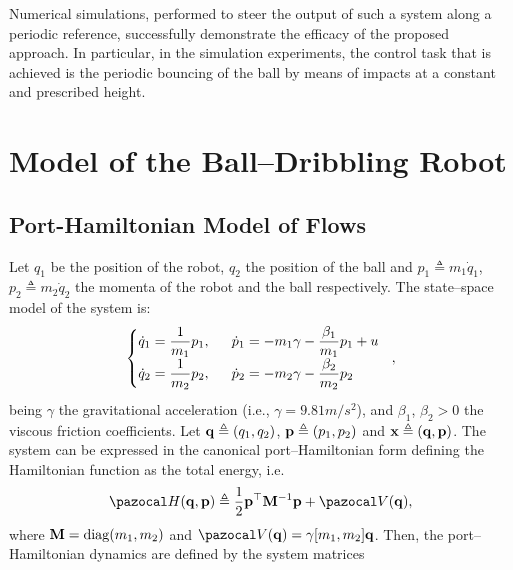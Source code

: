Numerical simulations, performed to steer the output of such a system along a periodic reference, successfully demonstrate the efficacy of the proposed approach. In particular, in the simulation experiments, the control task that is achieved is the periodic bouncing of the ball by means of impacts at a constant and prescribed height.
%
\clearpage
\section{Model of the Ball--Dribbling Robot}\label{sec:DBR}
%
\subsection{Port-Hamiltonian Model of Flows}
Let $q_1$ be the position of the robot, $q_2$ the position of the ball and $p_1 \triangleq  m_1\dot{q}_1$, $p_2 \triangleq  m_2\dot{q}_2$ the momenta of the robot and the ball respectively.
The state--space model of the system is:
%
\begin{equation}\label{eq:state-space}
    \left\{ 
        \begin{matrix*}[l]\vspace{1pt}
            \dot{q}_1 = \dfrac{1}{m_1}p_1,~~&\dot{p}_1 = -m_1\gamma -\dfrac{\beta_1}{m_1}p_1 + u\\\vspace{1pt} 
            \dot{q}_2 = \dfrac{1}{m_2}p_2,~~&\dot{p}_2 = -m_2\gamma -\dfrac{\beta_2}{m_2}p_2

        \end{matrix*}
    \right.~~,
\end{equation}
%
being $\gamma$ the gravitational acceleration (i.e., $\gamma = 9.81{m}/{s^2}$), and $\beta_1$, $\beta_2>0$ the viscous friction coefficients. Let $\mathbf{q} \triangleq (q_1,q_2)$, $\mathbf{p}\triangleq (p_1,p_2)$ and $\mathbf{x} \triangleq (\mathbf{q},\mathbf{p})$.
The system can be expressed in the canonical port--Hamiltonian form defining the Hamiltonian function as the total energy, i.e.
%
\begin{equation}
    \Ha(\qb,\pb) \triangleq \frac{1}{2}\pb^\top \Mb^{-1}\pb + \V(\qb),
\end{equation}
%
where $\mathbf{M} = \operatorname{diag}(m_1,m_2)$ and $\V(\qb) = \gamma[m_1,m_2]\qb$. Then, the port--Hamiltonian dynamics are defined by the system matrices
%
